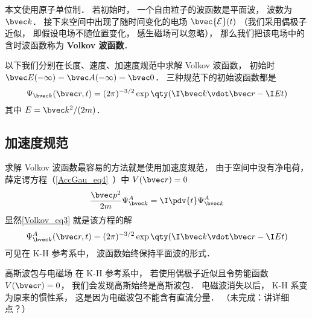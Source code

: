 
\begin{issues}
\issueTODO
\end{issues}


本文使用原子单位制． 若初始时， 一个自由粒子的波函数是平面波， 波数为 $\bvec k$． 接下来空间中出现了随时间变化的电场 $\bvec {\mathcal E}(t)$ （我们采用偶极子近似， 即假设电场不随位置变化， 感生磁场可以忽略）， 那么我们把该电场中的含时波函数称为 \textbf{Volkov 波函数}．

以下我们分别在长度、速度、加速度规范中求解 Volkov 波函数， 初始时 $\bvec E(-\infty) = \bvec A(-\infty) = \bvec 0$． 三种规范下的初始波函数都是
\begin{equation}\label{Volkov_eq3}
\Psi_{\bvec k}(\bvec r, t) = (2\pi)^{-3/2} \exp\qty(\I\bvec k \vdot \bvec r - \I Et)
\end{equation}
其中 $E = \bvec k^2/(2m)$．

\subsection{加速度规范}
求解 Volkov 波函数最容易的方法就是使用加速度规范， 由于空间中没有净电荷， 薛定谔方程（\autoref{AccGau_eq4}~）中 $V(\bvec r) = 0$
\begin{equation}
\frac{\bvec p^2}{2m}\Psi_{\bvec k}^A = \I \pdv{t} \Psi_{\bvec k}^A
\end{equation}
显然\autoref{Volkov_eq3} 就是该方程的解
\begin{equation}\label{Volkov_eq2}
\Psi_{\bvec k}^A(\bvec r, t) = (2\pi)^{-3/2} \exp\qty(\I\bvec k \vdot \bvec r - \I Et)
\end{equation}
可见在 K-H 参考系中， 波函数始终保持平面波的形式．

\begin{example}{高斯波包与电磁场}
在 K-H 参考系中， 若使用偶极子近似且令势能函数 $V(\bvec r) = 0$， 我们会发现高斯始终是高斯波包． 电磁波消失以后， K-H 系变为原来的惯性系， 这是因为电磁波包不能含有直流分量． （未完成：讲详细点？）
\end{example}

